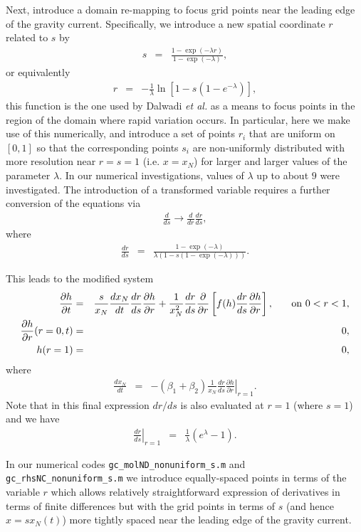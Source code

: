 \documentclass[11pt]{article}
\newcommand{\bea}{\begin{eqnarray}}
\newcommand{\eea}{\end{eqnarray}}
\begin{document}
Next, introduce a domain re-mapping to focus grid points near the leading edge of the gravity current.  Specifically, we introduce a new spatial coordinate $r$ related to $s$
by
\bea
s & = & \frac{1- \exp (-\lambda r)}{1 - \exp (-\lambda)},
\eea
or equivalently
\bea
r & = & - \frac{1}{\lambda} \ln \left[ 1 - s (1-e^{-\lambda}) \right],
\eea
this function is the one used by Dalwadi {\it et al.} \cite{Dalwadi_etal_2020} as a means to focus points in the region of the domain where rapid variation occurs.  In particular, 
here we make use of this numerically, and introduce a set of points $r_i$ that are uniform on $[0,1]$ so that the corresponding points $s_i$ are non-uniformly distributed with 
more resolution near $r=s=1$ (i.e. $x=x_N$) for larger and larger values of the parameter $\lambda$.  In our numerical investigations, values of $\lambda$ up to about $9$ were investigated.  
The introduction of a transformed variable requires a further conversion of the equations via 
\bea
\frac{d}{ds} \rightarrow \frac{d}{dr} \frac{dr}{ds},
\eea
where 
\bea
\frac{dr}{ds} & = & \frac{ 1 - \exp(-\lambda) } {\lambda  (1 - s(1 - \exp(-\lambda)))}.
\eea

This leads to the modified system
\bea
\label{eq:h_fixed_domain_drds}
\frac{\partial h}{\partial t} & = & \frac{s}{x_N} \frac{dx_N}{dt} \frac{dr}{ds} \frac{\partial h}{\partial r} + \frac{1}{x_N^2} \frac{dr}{ds} \frac{\partial}{\partial r} \left[ f(h) \frac{dr}{ds} \frac{\partial h}{\partial r} \right], \hspace{0.25in} \mbox{on $0 < r < 1$},\\
\label{eq:bc1_fixed_domain_drds}
\frac{\partial h}{\partial r}(r=0,t) & = & 0,\\
\label{eq:bc2_fixed_domain_drds}
h(r=1) & = & 0,
\eea
where
\bea
\label{eq:bc3_fixed_domain_drds}
\frac{dx_N}{dt} & = & - ( \beta_1 + \beta_2 ) \frac{1}{x_N} \frac{dr}{ds} \left. \frac{\partial h}{\partial r} \right|_{r=1}.
\eea
Note that in this final expression $dr/ds$ is also evaluated at $r=1$ (where $s=1$) and we have
\bea
\left. \frac{dr}{ds} \right|_{r=1} & = & \frac{1}{\lambda} \left( e^\lambda - 1 \right).
\eea

In our numerical codes {\tt gc\_molND\_nonuniform\_s.m} and {\tt gc\_rhsNC\_nonuniform\_s.m} we introduce equally-spaced points in terms of the variable $r$ which 
allows relatively straightforward expression of derivatives in terms of finite differences but with the grid points in terms of $s$ (and hence $x = s x_N(t)$) more tightly
spaced near the leading edge of the gravity current.
\end{document}
